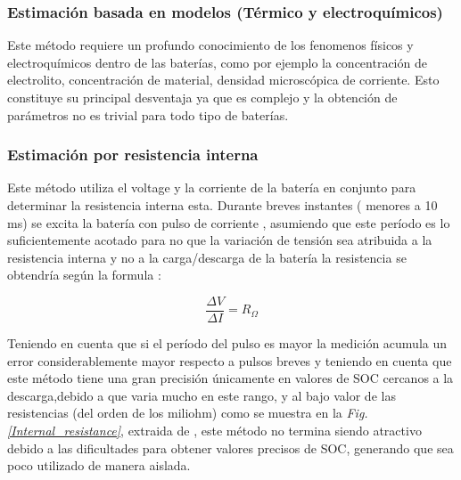 \documentclass[10pt,a4paper]{article}
\begin{document}
\clearpage

\subsubsection{Estimación basada en modelos (Térmico y electroquímicos)}
Este método requiere un profundo conocimiento de los fenomenos físicos y electroquímicos dentro de las baterías, como por ejemplo la concentración de electrolito, concentración de material, densidad microscópica de corriente. Esto constituye su principal desventaja ya que es complejo y la obtención de parámetros no es trivial para todo tipo de baterías.


\subsubsection{Estimación por resistencia interna}

Este método utiliza el voltage y la corriente de la batería en conjunto para determinar la resistencia interna esta. Durante breves instantes ( menores a 10 ms) se excita la batería con pulso de corriente , asumiendo que este período es lo suficientemente acotado para no que la variación de tensión sea atribuida a la resistencia interna y no a la carga/descarga de la batería la resistencia se obtendría según la formula :

\begin{figure}[h!]
	\begin{center}
		\begin{equation}
		\frac{\Delta V}{\Delta I} = R_\Omega 
		\label{Internal_resistance_EQ}
		\end{equation}	
	\end{center}
\end{figure}

 Teniendo en cuenta que si el período del pulso es mayor la medición acumula un error considerablemente mayor respecto a pulsos breves y teniendo en cuenta que este método tiene una gran precisión únicamente en valores de SOC cercanos a la descarga,debido a que varia mucho en este rango, y al bajo valor de las resistencias (del orden de los miliohm) como se muestra en la \emph{ Fig. \ref{Internal_resistance}}, extraida de \cite{hentunen2014}, este método no termina siendo atractivo debido a las dificultades para obtener valores precisos de SOC, generando que sea poco utilizado de manera aislada.
 
\end{document}
